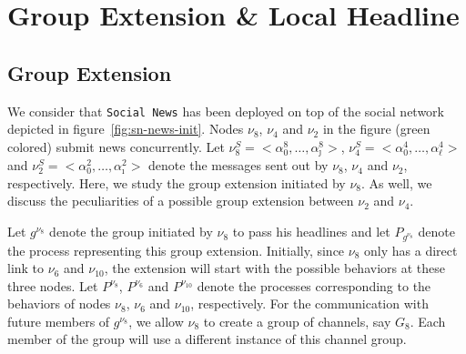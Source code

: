 \section{Group Extension \& Local Headline} %
\label{sec:group_extension_local_headline}

\subsection{Group Extension} %
\label{sub:group_extension}

We consider that {\tt Social News} has been deployed on top of the social network depicted in
figure~\ref{fig:sn-news-init}. Nodes $\nu_8$, $\nu_4$ and $\nu_2$ in the figure (green colored) submit news concurrently.
Let $\nu_8^S=<\alpha_0^8,\ldots,\alpha_\jmath^8>$, $\nu_4^S=<\alpha_0^4,\ldots,\alpha_\ell^4>$ and
$\nu_2^S=<\alpha_0^2,\ldots,\alpha_\imath^2>$ denote the messages sent out by $\nu_8$, $\nu_4$ and $\nu_2$, respectively.
Here, we study the group extension initiated by $\nu_8$. As well, we discuss the peculiarities of a possible group
extension between $\nu_2$ and $\nu_4$.

Let $g^{\nu_8}$ denote the group initiated by $\nu_8$ to pass his headlines and let $P_{g^{\nu_8}}$ denote the process
representing this group extension. Initially, since $\nu_8$ only has a direct link to $\nu_6$ and $\nu_{10}$, the
extension will start with the possible behaviors at these three nodes. Let $P^{\nu_8}$, $P^{\nu_6}$ and $P^{\nu_{10}}$
denote the processes corresponding to the behaviors of nodes $\nu_8$, $\nu_6$ and $\nu_{10}$, respectively. For the
communication with future members of $g^{\nu_8}$, we allow $\nu_8$ to create a group of channels, say $G_8$. Each member
of the group will use a different instance of this channel group.

